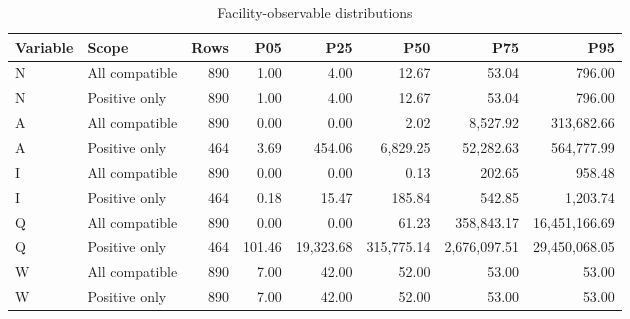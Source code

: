 \begin{table}[htbp]\centering\small
\caption{Facility-observable distributions}\label{tab:si_distributions}
\begin{tabular}{@{}llrrrrrr@{}}
\toprule
Variable & Scope & Rows & P05 & P25 & P50 & P75 & P95 \\\midrule
N & All compatible & 890 & 1.00 & 4.00 & 12.67 & 53.04 & 796.00 \\
N & Positive only & 890 & 1.00 & 4.00 & 12.67 & 53.04 & 796.00 \\
A & All compatible & 890 & 0.00 & 0.00 & 2.02 & 8,527.92 & 313,682.66 \\
A & Positive only & 464 & 3.69 & 454.06 & 6,829.25 & 52,282.63 & 564,777.99 \\
I & All compatible & 890 & 0.00 & 0.00 & 0.13 & 202.65 & 958.48 \\
I & Positive only & 464 & 0.18 & 15.47 & 185.84 & 542.85 & 1,203.74 \\
Q & All compatible & 890 & 0.00 & 0.00 & 61.23 & 358,843.17 & 16,451,166.69 \\
Q & Positive only & 464 & 101.46 & 19,323.68 & 315,775.14 & 2,676,097.51 & 29,450,068.05 \\
W & All compatible & 890 & 7.00 & 42.00 & 52.00 & 53.00 & 53.00 \\
W & Positive only & 890 & 7.00 & 42.00 & 52.00 & 53.00 & 53.00 \\
\bottomrule\end{tabular}
\end{table}
